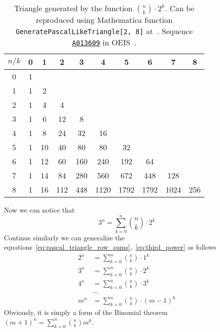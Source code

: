 \begin{table}[H]
    \begin{tabular}{c|ccccccccc}
        $n/k$ & 0 & 1  & 2   & 3   & 4    & 5    & 6    & 7    & 8 \\ [3px]
        \hline
        0     & 1 &    &     &     &      &      &      &      &     \\
        1     & 1 & 2  &     &     &      &      &      &      &     \\
        2     & 1 & 4  & 4   &     &      &      &      &      &     \\
        3     & 1 & 6  & 12  & 8   &      &      &      &      &     \\
        4     & 1 & 8  & 24  & 32  & 16   &      &      &      &     \\
        5     & 1 & 10 & 40  & 80  & 80   & 32   &      &      &     \\
        6     & 1 & 12 & 60  & 160 & 240  & 192  & 64   &      &     \\
        7     & 1 & 14 & 84  & 280 & 560  & 672  & 448  & 128  &     \\
        8     & 1 & 16 & 112 & 448 & 1120 & 1792 & 1792 & 1024 & 256 \\
    \end{tabular}
    \caption{Triangle generated by the function $\binom{n}{k}\cdot 2^k$.
    Can be reproduced using Mathematica function \texttt{GeneratePascalLikeTriangle[2, 8]} at~\cite{PK22Source}.
    Sequence \href{https://oeis.org/A013609}{\texttt{A013609}} in OEIS~\cite{Sloane_theencyclopedia}.}
    \label{tab:third_power}
\end{table}
Now we can notice that
\begin{equation}
    3^n = \sum_{k=0}^{n} \binom{n}{k} \cdot 2^k\label{eq:third_power}
\end{equation}
Continue similarly we can generalize the equations~\eqref{eq:pascal_triangle_row_sums},~\eqref{eq:third_power} as follows
\begin{align*}
    2^n &= \sum_{k=0}^{n}\binom{n}{k} \cdot 1^k \\
    3^n &= \sum_{k=0}^{n}\binom{n}{k} \cdot 2^k \\
    4^n &= \sum_{k=0}^{n}\binom{n}{k} \cdot 3^k \\
    &\dots \\
    m^n &= \sum_{k=0}^{n}\binom{n}{k} \cdot (m-1)^k
\end{align*}
Obviously, it is simply a form of the Binomial theorem $(m+1)^n = \sum_{k=0}^{n} \binom{n}{k} m^k$.
